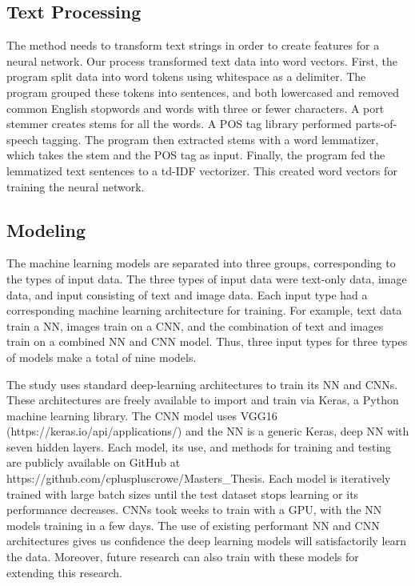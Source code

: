 \documentclass{article}
\begin{document}
\subsection{Text Processing}
The method needs to transform text strings in order to create features for a neural network. Our process transformed text data into word vectors. First, the program split data into word tokens using whitespace as a delimiter. The program grouped these tokens into sentences, and both lowercased and removed common English stopwords and words with three or fewer characters. A port stemmer creates stems for all the words. A POS tag library performed parts-of-speech tagging. The program then extracted stems with a word lemmatizer, which takes the stem and the POS tag as input. Finally, the program fed the lemmatized text sentences to a td-IDF vectorizer. This created word vectors for training the neural network.

\subsection{Modeling}
The machine learning models are separated into three groups, corresponding to the types of input data. The three types of input data were text-only data, image data, and input consisting of text and image data. Each input type had a corresponding machine learning architecture for training. For example, text data train a NN, images train on a CNN, and the combination of text and images train on a combined NN and CNN model. Thus, three input types for three types of models make a total of nine models.

The study uses standard deep-learning architectures to train its NN and CNNs. These architectures are freely available to import and train via Keras, a Python machine learning library. The CNN model uses VGG16 (https://keras.io/api/applications/) and the NN is a generic Keras, deep NN with seven hidden layers. Each model, its use, and methods for training and testing are publicly available on GitHub at https://github.com/cpluspluscrowe/Masters\_Thesis. Each model is iteratively trained with large batch sizes until the test dataset stops learning or its performance decreases. CNNs took weeks to train with a GPU, with the NN models training in a few days. The use of existing performant NN and CNN architectures gives us confidence the deep learning models will satisfactorily learn the data. Moreover, future research can also train with these models for extending this research.
\end{document}
